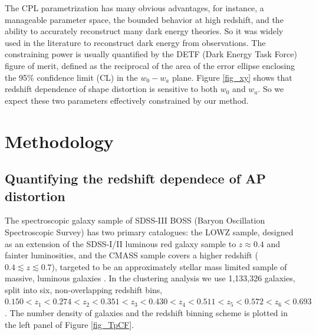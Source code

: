 \documentclass[iop]{emulateapj}
\begin{document}
The CPL parametrization has many obvious advantages, for instance, a manageable parameter space, 
the bounded behavior at high redshift, 
and the ability to accurately reconstruct many dark energy theories\cite{CPL_L}. 
So it was widely used in the literature to reconstruct dark energy from observations.
The constraining power is usually quantified by the DETF (Dark Energy Task Force) \cite{DETF} figure of merit, 
defined as the reciprocal of the area of the error ellipse enclosing the 95\% confidence limit (CL) in the $w_0-w_a$ plane. 
Figure \ref{fig_xy} shows that redshift dependence of shape distortion is sensitive to both $w_0$ and $w_a$.
So we expect these two parameters effectively constrained by our method.




\section{Methodology}

\subsection{Quantifying the redshift dependece of AP distortion}

The spectroscopic galaxy sample of SDSS-III BOSS (Baryon Oscillation Spectroscopic Survey) has two primary catalogues:
the LOWZ sample, designed as an extension of the SDSS-I/II luminous red galaxy sample to $z\approx 0.4$ and fainter luminosities,
and the CMASS sample covers a higher redshift ($0.4\lesssim z \lesssim 0.7$),
targeted to be an approximately stellar mass limited sample of massive, luminous galaxies \cite{Reidetal:2016}.
In the clustering analysis we use 1,133,326 galaxies, split into six, non-overlapping redshift bins, 
$0.150<z_1<0.274<z_2<0.351<z_3<0.430<z_4<0.511<z_5<0.572<z_6<0.693$.
The number density of galaxies and the redshift binning scheme is plotted in the left panel of Figure \ref{fig_TpCF}.
\end{document}
